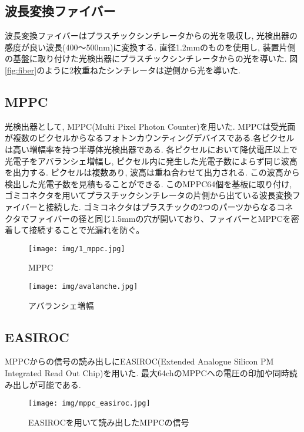 \subsection{波長変換ファイバー}
波長変換ファイバーはプラスチックシンチレータからの光を吸収し, 光検出器の感度が良い波長(400～500nm)に変換する.
直径1.2mmのものを使用し, 装置片側の基盤に取り付けた光検出器にプラスチックシンチレータからの光を導いた.
図\ref{fig:fiber}のように2枚重ねたシンチレータは逆側から光を導いた.

\subsection{MPPC}
光検出器として, MPPC(Multi Pixel Photon Counter)を用いた.
MPPCは受光面が複数のピクセルからなるフォトンカウンティングデバイスである.各ピクセルは高い増幅率を持つ半導体光検出器である.
各ピクセルにおいて降伏電圧以上で光電子をアバランシェ増幅し, ピクセル内に発生した光電子数によらず同じ波高を出力する.
ピクセルは複数あり, 波高は重ね合わせて出力される.
この波高から検出した光電子数を見積もることができる.
このMPPC64個を基板に取り付け, ゴミコネクタを用いてプラスチックシンチレータの片側から出ている波長変換ファイバーと接続した.
ゴミコネクタはプラスチックの2つのパーツからなるコネクタでファイバーの径と同じ1.5mmの穴が開いており、ファイバーとMPPCを密着して接続することで光漏れを防ぐ。

\begin{figure}[H]
    \begin{minipage}[b]{0.47\linewidth}
        \centering
        \texttt{[image: img/1\_mppc.jpg]}
        \caption{MPPC}
        \label{fig:mppc}
    \end{minipage}
    \begin{minipage}[b]{0.47\linewidth}
        \centering
        \texttt{[image: img/avalanche.jpg]}
        \caption{アバランシェ増幅}
        \label{fig:avalanche}
    \end{minipage}
\end{figure}

\subsection{EASIROC}
MPPCからの信号の読み出しにEASIROC(Extended Analogue Silicon PM Integrated Read Out Chip)を用いた.
最大64chのMPPCへの電圧の印加や同時読み出しが可能である.

\begin{figure}[H]
    \centering
    \texttt{[image: img/mppc\_easiroc.jpg]}
    \caption{EASIROCを用いて読み出したMPPCの信号}
    \label{fig:easiroc}
\end{figure}

